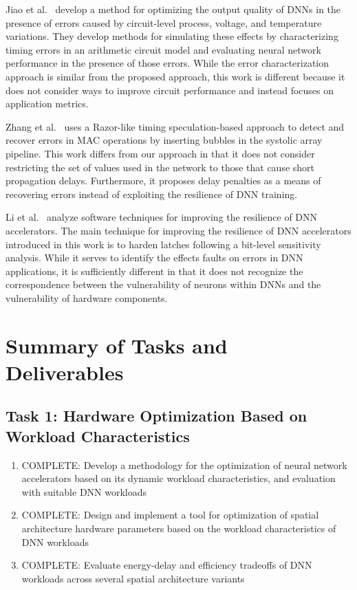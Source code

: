 Jiao et al.~\cite{jiao2017assessment} develop a method for optimizing the output quality of DNNs in the presence of errors caused by circuit-level process, voltage, and temperature variations.
They develop methods for simulating these effects by characterizing timing errors in an arithmetic circuit model and evaluating neural network performance in the presence of those errors.
While the error characterization approach is similar from the proposed approach, this work is different because it does not consider ways to improve circuit performance and instead focuses on application metrics.


Zhang et al.~\cite{zhang2017enabling} uses a Razor\cite{ernst2003razor}-like timing speculation-based approach to detect and recover errors in MAC operations by inserting bubbles in the systolic array pipeline.
This work differs from our approach in that it does not consider restricting the set of values used in the network to those that cause short propagation delays.
Furthermore, it proposes delay penalties as a means of recovering errors instead of exploiting the resilience of DNN training.

Li et al.~\cite{li2017understanding} analyze software techniques for improving the resilience of DNN accelerators.
The main technique for improving the resilience of DNN accelerators introduced in this work is to harden latches following a bit-level sensitivity analysis.
While it serves to identify the effects faults on errors in DNN applications, it is sufficiently different in that it does not recognize the correspondence between the vulnerability of neurons within DNNs and the vulnerability of hardware components.

\newpage
\appendix
\section{Summary of Tasks and Deliverables}

\subsection{Task 1: Hardware Optimization Based on Workload Characteristics}

\begin{enumerate}
    \item \textsc{COMPLETE}: Develop a methodology for the optimization of neural network accelerators based on its dynamic workload characteristics, and evaluation with suitable DNN workloads
    \item \textsc{COMPLETE}: Design and implement a tool for optimization of spatial architecture hardware parameters based on the workload characteristics of DNN workloads
    \item \textsc{COMPLETE}: Evaluate energy-delay and efficiency tradeoffs of DNN workloads across several spatial architecture variants
\end{enumerate}


